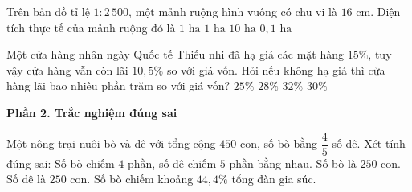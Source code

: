\begin{ex} %
Trên bản đồ tỉ lệ $1 : 2\,500$, một mảnh ruộng hình vuông có chu vi là $16\text{ cm}$. Diện tích thực tế của mảnh ruộng đó là
\choice
{$1\text{ ha}$}
{\True $1\text{ ha}$}
{$10\text{ ha}$}
{$0{,}1\text{ ha}$}
\end{ex}

\begin{ex} %
Một cửa hàng nhân ngày Quốc tế Thiếu nhi đã hạ giá các mặt hàng $15\%$, tuy vậy cửa hàng vẫn còn lãi $10{,}5\%$ so với giá vốn. Hỏi nếu không hạ giá thì cửa hàng lãi bao nhiêu phần trăm so với giá vốn?
\choice
{$25\%$}
{$28\%$}
{$32\%$}
{\True $30\%$}
\end{ex}

\textbf{Phần 2. Trắc nghiệm đúng sai}

\begin{ex} %
Một nông trại nuôi bò và dê với tổng cộng $450$ con, số bò bằng $\dfrac{4}{5}$ số dê. Xét tính đúng sai:
\choiceTF
{\True Số bò chiếm $4$ phần, số dê chiếm $5$ phần bằng nhau.}
{Số bò là $250$ con.}
{\True Số dê là $250$ con.}
{\True Số bò chiếm khoảng $44{,}4\%$ tổng đàn gia súc.}
\end{ex}

